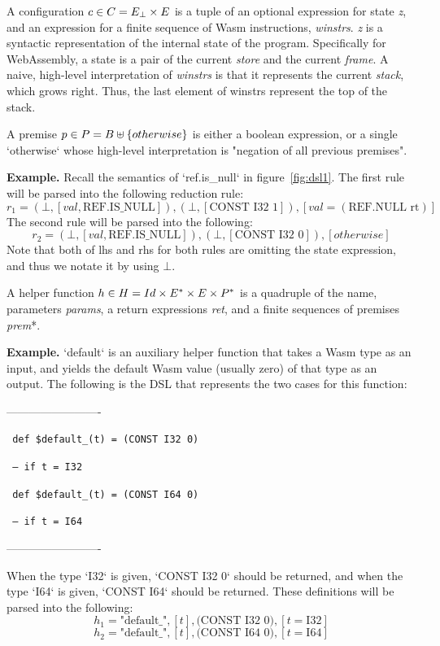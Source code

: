 A configuration $c \in C = E_\bot \times E$ is a tuple of an optional expression for state \textit{z},
and an expression for a finite sequence of Wasm instructions, \textit{winstrs}.
\textit{z} is a syntactic representation of the internal state of the program. Specifically for WebAssembly,
a state is a pair of the current \textit{store} and the current \textit{frame}. A naive, high-level
interpretation of \textit{winstrs} is that it represents the current \textit{stack}, which grows right.
Thus, the last element of winstrs represent the top of the stack.

A premise $p \in P = B \uplus \{otherwise\}$ is either a boolean expression, or a
single `otherwise` whose high-level interpretation is "negation of all previous premises".

\textbf{Example.} Recall the semantics of `ref.is\_null` in figure~\ref{fig:dsl1}.
The first rule will be parsed into the following reduction rule:
\[r_1=(\bot, [val, \text{REF.IS\_NULL}]), (\bot, [\text{CONST I32 1}]), [val = (\text{REF.NULL rt})]\]
The second rule will be parsed into the following:
\[r_2=(\bot, [val, \text{REF.IS\_NULL}]), (\bot, [\text{CONST I32 0}]), [otherwise]\]
Note that both of lhs and rhs for both rules are omitting the state expression,
and thus we notate it by using $\bot$.

A helper function $h \in H = Id \times E^\ast \times E \times P^\ast$ is a quadruple of
the name, parameters \textit{params}, a return expressions \textit{ret}, and a finite sequences of premises \textit{prem}*.

\textbf{Example.} `default` is an auxiliary helper function that takes a Wasm type as an input, and yields
the default Wasm value (usually zero) of that type as an output. The following is the
DSL that represents the two cases for this function:


-------------------------

\texttt{
def \$default\_(t) = (CONST I32 0)
}

\texttt{
-- if t = I32
}

\texttt{
def \$default\_(t) = (CONST I64 0)
}

\texttt{
-- if t = I64
}

-------------------------

When the type `I32` is given, `CONST I32 0` should be returned,
and when the type `I64` is given, `CONST I64` should be returned.
These definitions will be parsed into the following:
\[h_1=\text{"default\_"}, [t], \text{(CONST I32 0)}, [t = \text{I32}]\]
\[h_2=\text{"default\_"}, [t], \text{(CONST I64 0)}, [t = \text{I64}]\]


